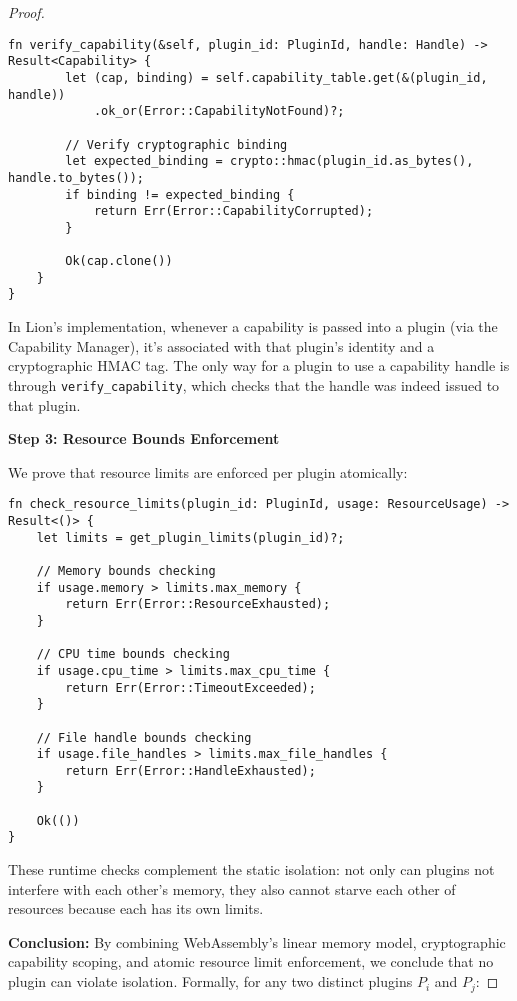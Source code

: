 \begin{proof}
\begin{lstlisting}[style=rust,caption={Capability system implementation}]
    fn verify_capability(&self, plugin_id: PluginId, handle: Handle) -> Result<Capability> {
        let (cap, binding) = self.capability_table.get(&(plugin_id, handle))
            .ok_or(Error::CapabilityNotFound)?;
        
        // Verify cryptographic binding
        let expected_binding = crypto::hmac(plugin_id.as_bytes(), handle.to_bytes());
        if binding != expected_binding {
            return Err(Error::CapabilityCorrupted);
        }
        
        Ok(cap.clone())
    }
}
\end{lstlisting}

In Lion's implementation, whenever a capability is passed into a plugin (via the Capability Manager), it's associated with that plugin's identity and a cryptographic HMAC tag. The only way for a plugin to use a capability handle is through \texttt{verify\_capability}, which checks that the handle was indeed issued to that plugin.

\textbf{Step 3: Resource Bounds Enforcement}

We prove that resource limits are enforced per plugin atomically:

\begin{lstlisting}[style=rust,caption={Resource bounds checking}]
fn check_resource_limits(plugin_id: PluginId, usage: ResourceUsage) -> Result<()> {
    let limits = get_plugin_limits(plugin_id)?;
    
    // Memory bounds checking
    if usage.memory > limits.max_memory {
        return Err(Error::ResourceExhausted);
    }
    
    // CPU time bounds checking  
    if usage.cpu_time > limits.max_cpu_time {
        return Err(Error::TimeoutExceeded);
    }
    
    // File handle bounds checking
    if usage.file_handles > limits.max_file_handles {
        return Err(Error::HandleExhausted);
    }
    
    Ok(())
}
\end{lstlisting}

These runtime checks complement the static isolation: not only can plugins not interfere with each other's memory, they also cannot starve each other of resources because each has its own limits.

\textbf{Conclusion:}
By combining WebAssembly's linear memory model, cryptographic capability scoping, and atomic resource limit enforcement, we conclude that no plugin can violate isolation. Formally, for any two distinct plugins $P_i$ and $P_j$:


\end{proof}
